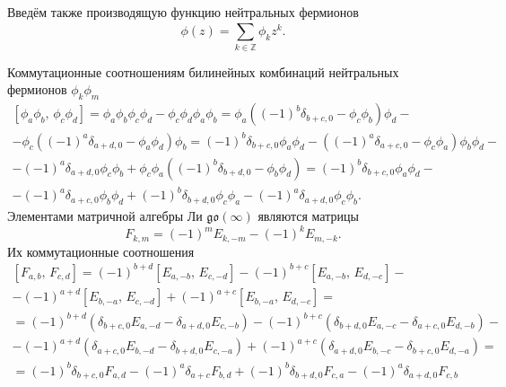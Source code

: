 \documentclass[a5paper,twoside]{article}
\numberwithin{equation}{section}
\begin{document}
Введём также производящую функцию нейтральных фермионов
\begin{equation}
	\phi(z)= \sum_{k \in \mathbb{Z}}^{} \phi_k z^k
.\end{equation} 

Коммутационные соотношениям
билинейных комбинаций нейтральных фермионов $\phi_k \phi_m$
\begin{multline}
\left[ \phi_{a}\phi_b,\,\phi_{c}\phi_d \right] =
\phi_a \phi_b \phi_c \phi_d -\phi_c \phi_d \phi_a \phi_b=
\phi_a \left( \left( -1 \right) ^b \delta_{b+c,0}-\phi_c \phi_b
 \right) 	\phi_d-\\-
 \phi_c \left( \left( -1 \right) ^a \delta_{a+d,0}-\phi_a \phi_d \right) \phi_b=
\left( -1 \right) ^b \delta_{b+c,0} \phi_a \phi_d-
(\left( -1 \right)^a \delta_{a+c,0}- \phi_c \phi_a) \phi_b \phi_d-\\-\left( -1 \right) ^a
\delta_{a+d,0} \phi_c \phi_b+\phi_c \phi_a \left(\left( -1 \right) ^b \delta_{b+d,0}-\phi_b \phi_d
\right) =\left( -1 \right) ^b \delta_{b+c,0} \phi_a \phi_d-\\-
\left( -1 \right)^a \delta_{a+c,0} \phi_b \phi_d+ \left( -1 \right) ^b \delta_{b+d,0} \phi_c \phi_a-\left( -1 \right) ^a
\delta_{a+d,0} \phi_c \phi_b
.\end{multline} 
Элементами матричной алгебры Ли $\mathfrak{go}(\infty)$
являются матрицы
\begin{equation}
	F_{k,m}=(-1)^m E_{k,-m}-(-1)^k E_{m,-k}
.\end{equation} 
Их коммутационные соотношения
\begin{multline}
	\left[ F_{a,b},\,F_{c,d} \right] =(-1)^{b+d}\left[ E_{a,-b},\, E_{c,-d} \right] -(-1)^{b+c} \left[ 
	E_{a,-b},\,E_{d,-c}\right] -\\-\left( -1 \right) ^{
a+d}\left[ E_{b,-a},\,E_{c,-d} \right] +
\left( -1 \right) ^{a+c}\left[ E_{b,-a},\,E_{d,-c} \right] =
\\=(-1)^{b+d}\left( \delta_{b+c,0} E_{a,-d}-
\delta_{a+d,0} E_{c,-b}\right) -
\left( -1 \right) ^{b+c}\left( \delta_{b+d,0}E_{a,-c}-
\delta_{a+c,0}E_{d,-b}\right)-\\-
\left( -1 \right) ^{a+d} \left( \delta_{a+c,0} E_{b,-d}
-\delta_{b+d,0}E_{c,-a}\right) +\left( -1 \right) ^{a+c}
\left( \delta_{a+d,0} E_{b,-c} -\delta_{b+c,0} E_{d,-a} \right) =\\=
(-1)^b \delta_{b+c,0} F_{a,d}-(-1)^a \delta_{a+c}F_{b,d}+
\left( -1 \right) ^b\delta_{b+d,0} F_{c,a}-\left( -1 \right) ^a \delta_{a+d,0} F_{c,b}
\end{multline} 
\end{document}
